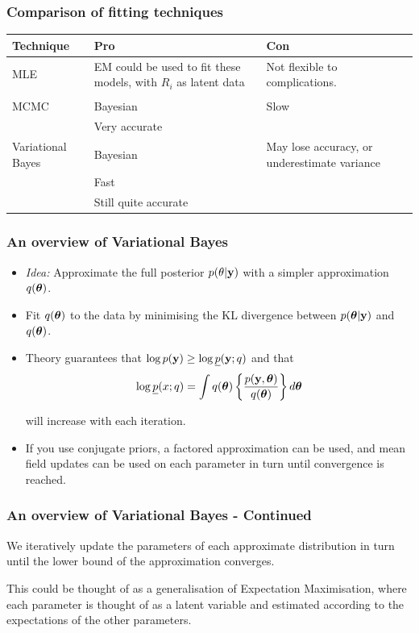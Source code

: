 \documentclass{beamer}
\begin{document}

\begin{frame}
\frametitle{Comparison of fitting techniques}
\begin{tabular}{p{2cm}p{3.5cm}p{4.5cm}}
Technique & Pro & Con \\
\hline
MLE & EM could be used to fit these models, with $R_i$ as latent data & Not flexible to complications. \\
& & \\ %
\hline
MCMC & Bayesian & Slow \\
	& Very accurate &  \\
\hline
Variational Bayes & Bayesian & May lose accuracy, or underestimate variance \\
& Fast  & \\ %
& Still quite accurate & \\
\hline
\end{tabular}

\end{frame}

\begin{frame}
\frametitle{An overview of Variational Bayes}
\begin{itemize}
\item \emph{Idea:} Approximate the full posterior $p(\theta|{\bf y})$ with a simpler approximation $q({\boldsymbol \theta})$.

\item Fit $q({\boldsymbol \theta})$ to the data by minimising the KL divergence between $p({\boldsymbol \theta}|{\bf y})$ and $q({\boldsymbol \theta})$.

\item Theory guarantees that $\log p({\bf y})\ge 
\log \underline{p}({\bf y};q)$ and that 
$$
\log \underline{p}(x;q) = \int q({\boldsymbol \theta}) \left\{ \frac{p({\bf y},{\boldsymbol \theta})}{q({\boldsymbol \theta})} \right\} d {\boldsymbol \theta}
$$ 

\noindent will
increase with each iteration.

\item If you use conjugate priors, a factored approximation can be used, and mean field updates can be used on
each parameter in turn until convergence is reached.
\end{itemize}
\end{frame}

\begin{frame}
\frametitle{An overview of Variational Bayes - Continued}
We iteratively update the parameters of each approximate distribution
in turn until the lower bound of the approximation converges.

\bigskip 
This could be thought of as a generalisation of Expectation Maximisation, where each parameter is thought of as a latent
variable and estimated according to the expectations of the other parameters.
\end{frame}
\end{document}
